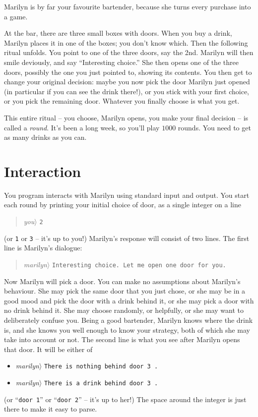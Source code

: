 


Marilyn is by far your favourite bartender, because she turns every purchase into a game.

At the bar, there are three small boxes with doors.
When you buy a drink, Marilyn places it in one of the boxes; you don't know which.
Then the following ritual unfolds.
You point to one of the three doors, say the 2nd.
Marilyn will then smile deviously, and say “Interesting choice.”
She then opens one of the three doors, possibly the one you just pointed to, showing its contents.
You then get to change your original decision: maybe you now pick the door Marilyn just opened (in particular if you can see the drink there!), or you stick with your first choice, or you pick the remaining door.
Whatever you finally choose is what you get.

This entire ritual – you choose, Marilyn opens, you make your final decision -- is called a \emph{round}.
It’s been a long week, so you’ll play $1000$ rounds.
You need to get as many drinks as you can.

\section*{Interaction}

You program interacts with Marilyn using standard input and output.
You start each round by printing your initial choice of door, as a single integer on a line
\begin{quote}\emph{you}$\rangle$ \verb}2}\end{quote}
(or \verb}1} or \verb}3} -- it's up to you!)
Marilyn’s response will consist of two lines.
The first line is Marilyn's dialogue:
\begin{quote}\emph{marilyn}$\rangle$ \verb}Interesting choice. Let me open one door for you.}\end{quote}
Now Marilyn will pick a door.
You can make no assumptions about Marilyn's behaviour.
She may pick the same door that you just chose, or she may be in a good mood and pick the door with a drink behind it, or she may pick a door with no drink behind it.
She may choose randomly, or helpfully, or she may want to deliberately confuse you.
Being a good bartender, Marilyn knows where the drink is, and she knows you well enough to know your strategy, both of which she may take into account or not.
The second line is what you see after Marilyn opens that door.
It will be either of
\begin{itemize}
  \item
\emph{marilyn}$\rangle$ \verb}There is nothing behind door 3 .}
\item
  \emph{marilyn}$\rangle$ \verb}There is a drink behind door 3 .}
\end{itemize}
(or “\verb}door 1}” or “\verb}door 2}” -- it's up to her!) 
The space around the integer is just there to make it easy to parse.

